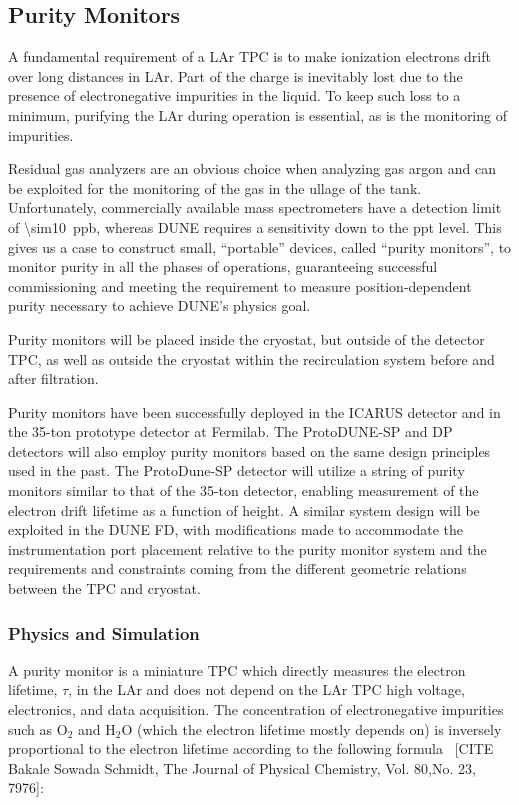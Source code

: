\subsection{Purity Monitors} 
\label{sec:fdsp-slow-cryo-purity-mon}
A fundamental requirement of a LAr TPC is to make ionization electrons drift over long distances in LAr. Part of the charge is inevitably lost due to the presence of electronegative impurities in the liquid. To keep such loss to a minimum, purifying the LAr during operation is essential, as is the monitoring of impurities.

Residual gas analyzers are an obvious choice when analyzing gas argon and can be exploited for the monitoring of the gas in the ullage of the tank. Unfortunately, commercially available mass spectrometers have a detection limit of \SI{\sim10}{ppb}, whereas DUNE requires a sensitivity down to the \si{ppt} level. This gives us a case to construct small, ``portable'' devices, called ``purity monitors'', to monitor purity in all the phases of operations, guaranteeing successful commissioning and meeting the requirement to measure position-dependent purity necessary to achieve DUNE's physics goal. 

Purity monitors will be placed inside the cryostat, but outside of the detector TPC, as well as outside the cryostat within the recirculation system before and after filtration.

Purity monitors have been successfully deployed in the ICARUS detector and in the 35-ton prototype detector at Fermilab. The ProtoDUNE-SP and DP detectors will also employ purity monitors based on the same design principles used in the past. The ProtoDune-SP detector will utilize a string of purity monitors similar to that of the 35-ton detector, enabling measurement of the electron drift lifetime as a function of height.  A similar system design will be exploited in the DUNE FD, with modifications made to accommodate the instrumentation port placement relative to the purity monitor system and the requirements and constraints coming from the different geometric relations between the TPC and cryostat. 

\subsubsection{Physics and Simulation}
A purity monitor is a miniature TPC which directly measures the electron lifetime, $\tau$, in the LAr and does not depend on the LAr TPC high voltage, electronics, and data acquisition. The concentration of electronegative impurities such as $\text{O}_2$ and $\text{H}_2\text{O}$ (which the electron lifetime mostly depends on) is inversely proportional to the electron lifetime according to the following formula~\cite{BakaleSowadaSchmidt} [CITE Bakale Sowada Schmidt, The Journal of Physical Chemistry, Vol. 80,No. 23, 7976]:

